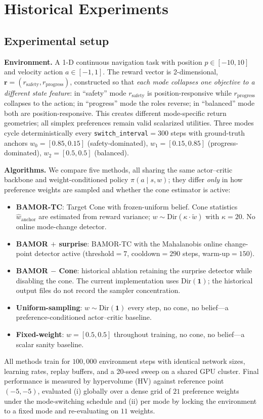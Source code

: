 \section{Historical Experiments}
\label{app:historical_synthetic}

\subsection{Experimental setup}
\label{sec:exp_setup}

\textbf{Environment.}  A 1-D continuous navigation task with position $p\in[-10,10]$ and velocity action $a\in[-1,1]$.  The reward vector is 2-dimensional, $\mathbf{r}=(r_{\text{safety}}, r_{\text{progress}})$, constructed so that \emph{each mode collapses one objective to a different state feature}: in ``safety'' mode $r_{\text{safety}}$ is position-responsive while $r_{\text{progress}}$ collapses to the action; in ``progress'' mode the roles reverse; in ``balanced'' mode both are position-responsive.  This creates different mode-specific return geometries; all simplex preferences remain valid scalarized utilities.  Three modes cycle deterministically every \texttt{switch\_interval}$=300$ steps with ground-truth anchors $w_0{=}[0.85,0.15]$ (safety-dominated), $w_1{=}[0.15,0.85]$ (progress-dominated), $w_2{=}[0.5,0.5]$ (balanced).

\textbf{Algorithms.}  We compare five methods, all sharing the same actor--critic backbone and weight-conditioned policy $\pi(a\mid s, w)$; they differ \emph{only} in how preference weights are sampled and whether the cone estimator is active:
\begin{itemize}[topsep=1pt,leftmargin=1.3em]
    \item \textbf{BAMOR-TC}: Target Cone with frozen-uniform belief. Cone statistics $\hat w_{\mathrm{anchor}}$ are estimated from reward variance; $w \sim \mathrm{Dir}(\kappa \cdot \tilde w)$ with $\kappa{=}20$. No online mode-change detector.
    \item \textbf{BAMOR $+$ surprise}: BAMOR-TC with the Mahalanobis online change-point detector active (threshold$=7$, cooldown$=290$ steps, warm-up$=150$).
    \item \textbf{BAMOR $-$ Cone}: historical ablation retaining the surprise detector while disabling the cone. The current implementation uses $\mathrm{Dir}(\mathbf 1)$; the historical output files do not record the sampler concentration.
    \item \textbf{Uniform-sampling}: $w \sim \mathrm{Dir}(\mathbf{1})$ every step, no cone, no belief---a preference-conditioned actor--critic baseline.
    \item \textbf{Fixed-weight}: $w=[0.5,0.5]$ throughout training, no cone, no belief---a scalar sanity baseline.
\end{itemize}
All methods train for $100{,}000$ environment steps with identical network sizes, learning rates, replay buffers, and a 20-seed sweep on a shared GPU cluster.  Final performance is measured by hypervolume (HV) against reference point $(-5,-5)$, evaluated (i) globally over a dense grid of $21$ preference weights under the mode-switching schedule and (ii) per mode by locking the environment to a fixed mode and re-evaluating on $11$ weights.

